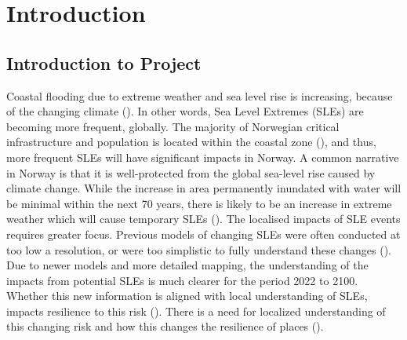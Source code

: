 




\chapter{Introduction}
\section{Introduction to Project}
Coastal flooding due to extreme weather and sea level rise is increasing, because of the changing climate (\cite{hoffken_effects_2020}).  In other words, Sea Level Extremes (SLEs) are becoming more frequent, globally. The majority of Norwegian critical infrastructure and population is located within the coastal zone (\cite{engebakken_construction_2022}), and thus, more frequent SLEs will have significant impacts in Norway. A common narrative in Norway is that it is well-protected from the global sea-level rise caused by climate change. While the increase in area permanently inundated with water will be minimal within the next 70 years, there is likely to be an increase in extreme weather which will cause temporary SLEs (\cite{aunan_strong_2008}). The localised impacts of  SLE events requires greater focus. Previous models of changing SLEs were often conducted at too low a resolution, or were too simplistic to fully understand these changes (\cite{hoffken_effects_2020}). Due to newer models and more detailed mapping, the understanding of the impacts from potential SLEs is much clearer for the period 2022 to 2100. Whether this new information is aligned with local understanding of SLEs, impacts resilience to this risk (\cite{setten_we_2019}).  There is a need for localized understanding of this changing risk and how this changes the resilience of places (\cite{rod_integrated_2012}).
